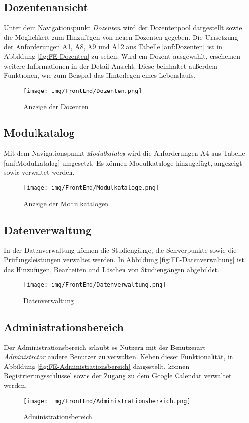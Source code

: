 \subsection{Dozentenansicht}
Unter dem Navigationspunkt \textit{Dozenten} wird der Dozentenpool dargestellt sowie die Möglichkeit zum Hinzufügen von neuen Dozenten gegeben.
Die Umsetzung der Anforderungen A1, A8, A9 und A12 aus Tabelle \vref{anf:Dozenten} ist in Abbildung \vref{fig:FE-Dozenten} zu sehen.
Wird ein Dozent ausgewählt, erscheinen weitere Informationen in der Detail-Ansicht. Diese beinhaltet außerdem Funktionen, wie zum Beispiel das Hinterlegen eines Lebenslaufs.
\begin{figure}[H]
	\centering 
	\texttt{[image: img/FrontEnd/Dozenten.png]}
	\caption[Anzeige der Dozenten]{\label{fig:FE-Dozenten}Anzeige der Dozenten}
\end{figure}

\subsection{Modulkatalog}
Mit dem Navigationspunkt \textit{Modulkatalog} wird die Anforderungen A4 aus Tabelle \vref{anf:Modulkatalog} umgesetzt. 
Es können Modulkataloge hinzugefügt, angezeigt sowie verwaltet werden. 
\begin{figure}[H]
	\centering 
	\texttt{[image: img/FrontEnd/Modulkataloge.png]}
	\caption[Anzeige der Modulkatalogen]{\label{fig:FE-Modulkataloge}Anzeige der Modulkatalogen}
\end{figure}

\subsection{Datenverwaltung}
In der Datenverwaltung können die Studiengänge, die Schwerpunkte sowie die Prüfungsleistungen verwaltet werden.
In Abbildung \vref{fig:FE-Datenverwaltung} ist das Hinzufügen, Bearbeiten und Löschen von Studiengängen abgebildet.
\begin{figure}[H]
	\centering 
	\texttt{[image: img/FrontEnd/Datenverwaltung.png]}
	\caption[Datenverwaltung]{\label{fig:FE-Datenverwaltung}Datenverwaltung}
\end{figure}

\subsection{Administrationsbereich}
Der Administrationsbereich erlaubt es Nutzern mit der Benutzerart \textit{Administrator} andere Benutzer zu verwalten.
Neben dieser Funktionalität, in Abbildung \vref{fig:FE-Administrationsbereich} dargestellt, können Registrierungsschlüssel sowie der Zugang zu dem Google Calendar verwaltet werden.
\begin{figure}[H]
	\centering 
	\texttt{[image: img/FrontEnd/Administrationsbereich.png]}
	\caption[Administrationsbereich]{\label{fig:FE-Administrationsbereich}Administrationsbereich}
\end{figure}

